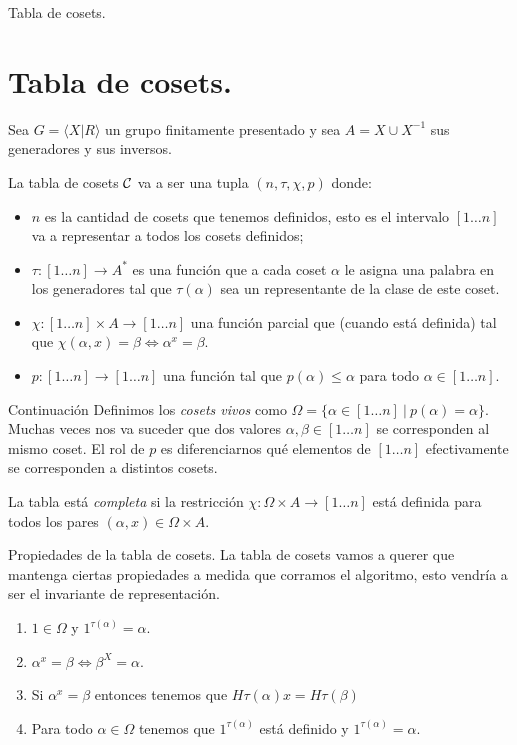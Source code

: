\documentclass[aspectratio=169, 9pt]{beamer}
\newcommand{\fp}{finitamente presentado }
\newcommand{\In}{[1 \dots n]}
\newcommand{\Co}{\cal{C}}
\begin{document}
\begin{frame}[fragile]{Tabla de cosets.}
	\section{Tabla de cosets.}
	Sea $G = \langle X | R \rangle$ un grupo \fp y sea $A = X \cup X^{-1}$ sus generadores y sus inversos.
	\pause
	
	La tabla de cosets $\Co $ va a ser una tupla $(n, \tau, \chi, p)$ donde:
	\pause
	\begin{itemize}
		\item $n$ es la cantidad de cosets que tenemos definidos, esto es el intervalo $\In$ va a representar a todos los cosets definidos;
		\pause
		\item $\tau : \In \to A^*$ es una función que a cada coset $\alpha$ le asigna una palabra en los generadores tal que $\tau(\alpha)$ sea un representante de la clase de este coset.
		\pause
		\item $\chi: \In \times A \to \In$ una función parcial que (cuando está definida) tal que $\chi(\alpha, x) = \beta \iff \alpha^x = \beta$.
		\pause
		\item $p: [1 \dots n] \to [1 \dots n]$ una función tal que $p(\alpha) \le \alpha$ para todo $\alpha \in [1\dots n]$.
	\end{itemize}
	
\end{frame}

\begin{frame}[fragile]{Continuación}
	Definimos los \emph{cosets vivos} como $\Omega = \{ \alpha \in \In  \ | \ p(\alpha) = \alpha \}$.
	Muchas veces nos va suceder que dos valores $\alpha, \beta \in \In$ se corresponden al mismo coset.
	El rol de $p$ es diferenciarnos qué elementos de $\In$ efectivamente se corresponden a distintos cosets.
	\pause
	\medskip
	
	
	
	La tabla está \emph{completa} si la restricción $\chi:\Omega \times A \to \In$ está definida para todos los pares $(\alpha, x) \in \Omega \times A$. 
\end{frame}

\begin{frame}[fragile]{Propiedades de la tabla de cosets.}
	La tabla de cosets vamos a querer que mantenga ciertas propiedades a medida que corramos el algoritmo, esto vendría a ser el invariante de representación.
	\pause
	
	
	
	\begin{enumerate}
		\item $1 \in \Omega$ y $1^{\tau(\alpha)} = \alpha$.
		\pause
		\item $\alpha^x = \beta \iff \beta^{X} = \alpha$.
		\pause
		\item Si $\alpha^x = \beta$ entonces tenemos que $H \tau(\alpha) x = H \tau(\beta)$
		\pause
		\item Para todo $\alpha \in \Omega$ tenemos que $1^{\tau(\alpha)}$ está definido y $1^{\tau(\alpha)} = \alpha$.
	\end{enumerate}
\end{frame}
\end{document}
